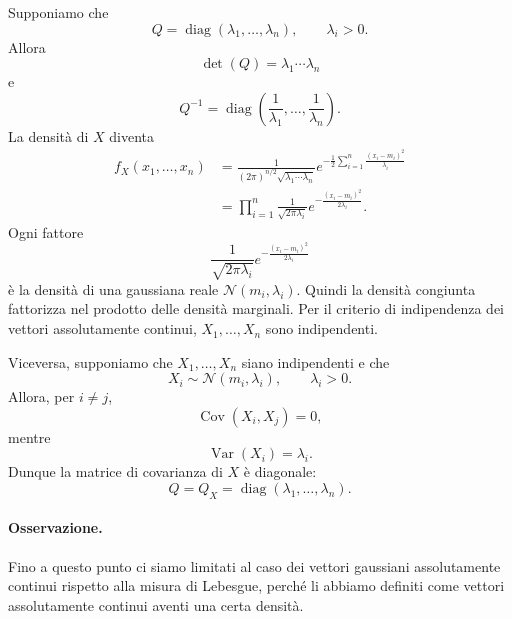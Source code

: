 \documentclass[a4paper]{article}
\begin{document}
\begin{snippetproof}{}
    \begin{iffproof}
    \item
        Supponiamo che
        \[
            Q=\operatorname{diag}(\lambda_1,\ldots,\lambda_n),
            \qquad
            \lambda_i>0.
        \]
        Allora
        \[
            \det(Q)=\lambda_1\cdots\lambda_n
        \]
        e
        \[
            Q^{-1}
            =
            \operatorname{diag}
            \left(
                \frac{1}{\lambda_1},
                \ldots,
                \frac{1}{\lambda_n}
            \right).
        \]
        La densità di \(X\) diventa
        \begin{align*}
            f_X(x_1,\ldots,x_n)
            &=
            \frac{1}{(2\pi)^{n/2}\sqrt{\lambda_1\cdots\lambda_n}}
            e^{-\frac12\sum_{i=1}^n\frac{(x_i-m_i)^2}{\lambda_i}}\\
            &=
            \prod_{i=1}^n
            \frac{1}{\sqrt{2\pi\lambda_i}}
            e^{-\frac{(x_i-m_i)^2}{2\lambda_i}}.
        \end{align*}
        Ogni fattore
        \[
            \frac{1}{\sqrt{2\pi\lambda_i}}
            e^{-\frac{(x_i-m_i)^2}{2\lambda_i}}
        \]
        è la densità di una gaussiana reale \(\mathcal N(m_i,\lambda_i)\).
        Quindi la densità congiunta fattorizza nel prodotto delle densità marginali. Per il criterio di indipendenza dei vettori assolutamente continui, \(X_1,\ldots,X_n\) sono indipendenti.

    \item
        Viceversa, supponiamo che \(X_1,\ldots,X_n\) siano indipendenti e che
        \[
            X_i\sim\mathcal N(m_i,\lambda_i),
            \qquad
            \lambda_i>0.
        \]
        Allora, per \(i\neq j\),
        \[
            \operatorname{Cov}(X_i,X_j)=0,
        \]
        mentre
        \[
            \operatorname{Var}(X_i)=\lambda_i.
        \]
        Dunque la matrice di covarianza di \(X\) è diagonale:
        \[
            Q=Q_X
            =
            \operatorname{diag}(\lambda_1,\ldots,\lambda_n).
        \]
    \end{iffproof}
\end{snippetproof}

\paragraph{Osservazione.}
Fino a questo punto ci siamo limitati al caso dei vettori gaussiani assolutamente continui rispetto alla misura di Lebesgue, perché li abbiamo definiti come vettori assolutamente continui aventi una certa densità.
\end{document}
